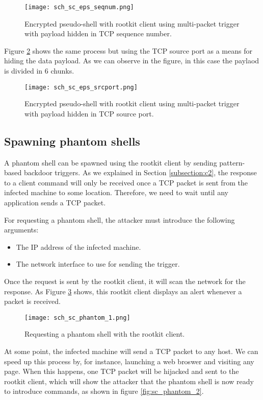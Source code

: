 \begin{figure}[htbp]
	\centering
	\texttt{[image: sch\_sc\_eps\_seqnum.png]}
	\caption{Encrypted pseudo-shell with rootkit client using multi-packet trigger with payload hidden in TCP sequence number.}
	\label{fig:sc_eps_seqnum}
\end{figure}

Figure \ref{fig:sc_eps_srcport} shows the same process but using the TCP source port as a means for hiding the data payload. As we can observe in the figure, in this case the paylaod is divided in 6 chunks.

\begin{figure}[htbp]
	\centering
	\texttt{[image: sch\_sc\_eps\_srcport.png]}
	\caption{Encrypted pseudo-shell with rootkit client using multi-packet trigger with payload hidden in TCP source port.}
	\label{fig:sc_eps_srcport}
\end{figure}

\subsection{Spawning phantom shells}
A phantom shell can be spawned using the rootkit client by sending pattern-based backdoor triggers. As we explained in Section \ref{subsection:c2}, the response to a client command will only be received once a TCP packet is sent from the infected machine to some location. Therefore, we need to wait until any application sends a TCP packet.

For requesting a phantom shell, the attacker must introduce the following arguments:
\begin{itemize}
\item The IP address of the infected machine.
\item The network interface to use for sending the trigger.
\end{itemize}

Once the request is sent by the rootkit client, it will scan the network for the response. As Figure \ref{fig:sc_phantom_1} shows, this rootkit client displays an alert whenever a packet is received.

\begin{figure}[htbp]
	\centering
	\texttt{[image: sch\_sc\_phantom\_1.png]}
	\caption{Requesting a phantom shell with the rootkit client.}
	\label{fig:sc_phantom_1}
\end{figure}

At some point, the infected machine will send a TCP packet to any host. We can speed up this process by, for instance, launching a web broswer and visiting any page. When this happens, one TCP packet will be hijacked and sent to the rootkit client, which will show the attacker that the phantom shell is now ready to introduce commands, as shown in figure \ref{fig:sc_phantom_2}.

